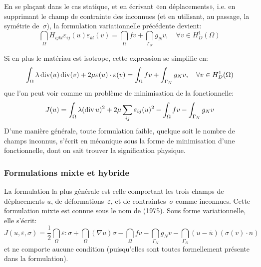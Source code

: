 En se plaçant dans le cas statique, et en écrivant «en déplacements», i.e. en supprimant le champ de contrainte des inconnues (et en utilisant, au passage, la symétrie de~$\sigma$), la formulation variationnelle précédente devient:
\begin{equation}
\dint_\Omega H_{ijkl}\varepsilon_{ij}(u)\varepsilon_{kl}(v) = \dint_\Omega fv +
\dint_{\Gamma_N} g_N v, \quad \forall v\in H^1_D(\Omega)
\end{equation}

\medskip
Si en plus le matériau est isotrope, cette expression se simplifie en:
\begin{equation}
\displaystyle\int_\Omega \lambda \operatorname{div}(u)\operatorname{div}(v)+2\mu\varepsilon(u)\cdot\varepsilon(v) = \displaystyle\int_\Omega fv +
\displaystyle\int_{\Gamma_N} g_N v, \quad \forall v\in H^1_D(\Omega)
\end{equation}
que l'on peut voir comme un problème de minimisation de la fonctionnelle:
\begin{equation}
J(u)=
\displaystyle\int_\Omega \lambda (\operatorname{div} u)^2+2\mu\displaystyle\sum_{ij}\varepsilon_{ij}(u)^2 - \displaystyle\int_\Omega fv -
\displaystyle\int_{\Gamma_N} g_N v
\end{equation}
D'une manière générale, toute formulation faible, quelque soit le nombre de champs inconnus, s'écrit en mécanique sous la forme de minimisation d'une fonctionnelle, dont on sait trouver la signification physique.

\medskip
\subsubsection{Formulations mixte et hybride}\label{Sec-MH}
La formulation la plus générale est celle comportant les trois champs de déplacements $u$, de déformations~$\varepsilon$, et de contraintes~$\sigma$ comme inconnues.
Cette formulation mixte est connue sous le nom de  (1975). Sous forme variationnelle, elle s'écrit:
\begin{equation}
J(u,\varepsilon,\sigma) =
\frac12 \dint_\Omega \varepsilon:\sigma
+\dint_\Omega (\nabla u) \sigma
- \dint_\Omega f v
- \dint_{\Gamma_N} g_N v
- \dint_{\Gamma_D} (u-\overline{u}) (\sigma(v)\cdot n)
\end{equation}
et ne comporte aucune condition (puisqu'elles sont toutes formellement présente dans la formulation).

